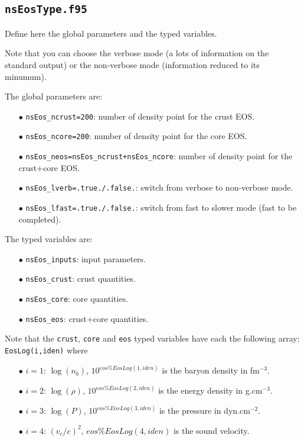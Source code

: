 \documentclass[11pt]{article}
\newcommand{\code}[1]{\colorbox{light-gray}{\mbox{\texttt{#1}}}}
\begin{document}
\subsection{\code{nsEosType.f95}}

Define here the global parameters and the typed variables.

Note that you can choose the verbose mode (a lots of information on the standard output) or the non-verbose mode (information reduced to its minumum). 

The global parameters are:
\begin{enumerate}
\item[$\bullet$] \code{nsEos\_ncrust=200}: number of density point for the crust EOS.
\item[$\bullet$] \code{nsEos\_ncore=200}: number of density point for the core EOS.
\item[$\bullet$] \code{nsEos\_neos=nsEos\_ncrust+nsEos\_ncore}: number of density point for the crust+core EOS.
\item[$\bullet$] \code{nsEos\_lverb=.true./.false.}: switch from verbose to non-verbose mode.
\item[$\bullet$] \code{nsEos\_lfast=.true./.false.}: switch from fast to slower mode (fast to be completed).
\end{enumerate}

The typed variables are:
\begin{enumerate}
\item[$\bullet$] \code{nsEos\_inputs}: input parameters.
\item[$\bullet$] \code{nsEos\_crust}: crust quantities.
\item[$\bullet$] \code{nsEos\_core}: core quantities.
\item[$\bullet$] \code{nsEos\_eos}: crust+core quantities.
\end{enumerate}

Note that the \code{crust}, \code{core} and \code{eos} typed variables have each the following array: \code{EosLog(i,iden)} where 
\begin{enumerate}
\item[$\bullet$] $i=1$: $\log(n_b)$, \code{$10^{eos\%EosLog(1,iden)}$} is the baryon density in fm$^{-3}$.
\item[$\bullet$] $i=2$: $\log(\rho)$, \code{$10^{eos\%EosLog(2,iden)}$} is the energy density in g.cm$^{-3}$.
\item[$\bullet$] $i=3$: $\log(P)$, \code{$10^{eos\%EosLog(3,iden)}$} is the pressure in dyn.cm$^{-2}$.
\item[$\bullet$] $i=4$: $(v_c/c)^2$, \code{$eos\%EosLog(4,iden)$} is the sound velocity.
\end{enumerate}
\end{document}
